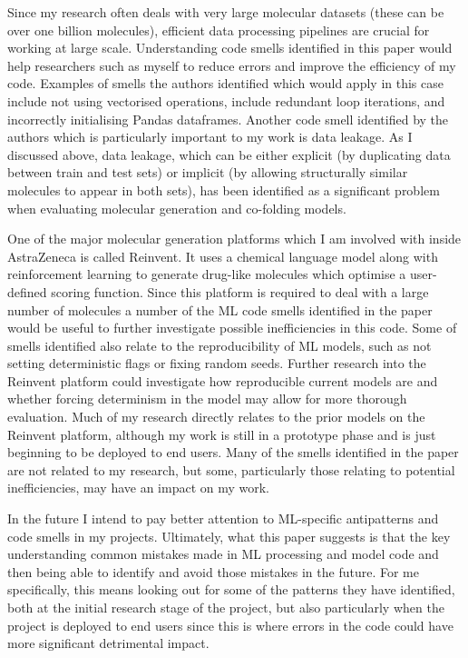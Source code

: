 \documentclass{article}
\begin{document}
Since my research often deals with very large molecular datasets (these can be over one billion molecules), efficient data processing pipelines are crucial for working at large scale. Understanding code smells identified in this paper would help researchers such as myself to reduce errors and improve the efficiency of my code. Examples of smells the authors identified which would apply in this case include not using vectorised operations, include redundant loop iterations, and incorrectly initialising Pandas dataframes. Another code smell identified by the authors which is particularly important to my work is data leakage. As I discussed above, data leakage, which can be either explicit (by duplicating data between train and test sets) or implicit (by allowing structurally similar molecules to appear in both sets), has been identified as a significant problem when evaluating molecular generation and co-folding models.

One of the major molecular generation platforms which I am involved with inside AstraZeneca is called Reinvent. It uses a chemical language model along with reinforcement learning to generate drug-like molecules which optimise a user-defined scoring function. Since this platform is required to deal with a large number of molecules a number of the ML code smells identified in the paper would be useful to further investigate possible inefficiencies in this code. Some of smells identified also relate to the reproducibility of ML models, such as not setting deterministic flags or fixing random seeds. Further research into the Reinvent platform could investigate how reproducible current models are and whether forcing determinism in the model may allow for more thorough evaluation. Much of my research directly relates to the prior models on the Reinvent platform, although my work is still in a prototype phase and is just beginning to be deployed to end users. Many of the smells identified in the paper are not related to my research, but some, particularly those relating to potential inefficiencies, may have an impact on my work.

In the future I intend to pay better attention to ML-specific antipatterns and code smells in my projects. Ultimately, what this paper suggests is that the key understanding common mistakes made in ML processing and model code and then being able to identify and avoid those mistakes in the future. For me specifically, this means looking out for some of the patterns they have identified, both at the initial research stage of the project, but also particularly when the project is deployed to end users since this is where errors in the code could have more significant detrimental impact.
\end{document}
